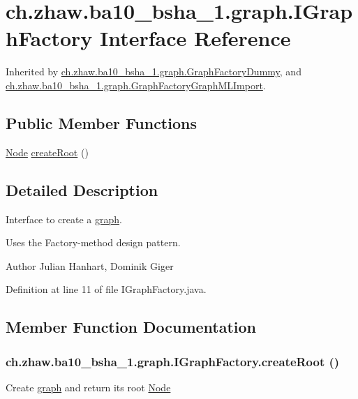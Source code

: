 \hypertarget{interfacech_1_1zhaw_1_1ba10__bsha__1_1_1graph_1_1IGraphFactory}{
\section{ch.zhaw.ba10\_\-bsha\_\-1.graph.IGraphFactory Interface Reference}
\label{interfacech_1_1zhaw_1_1ba10__bsha__1_1_1graph_1_1IGraphFactory}
}


Inherited by \hyperlink{classch_1_1zhaw_1_1ba10__bsha__1_1_1graph_1_1GraphFactoryDummy}{ch.zhaw.ba10\_\-bsha\_\-1.graph.GraphFactoryDummy}, and \hyperlink{classch_1_1zhaw_1_1ba10__bsha__1_1_1graph_1_1GraphFactoryGraphMLImport}{ch.zhaw.ba10\_\-bsha\_\-1.graph.GraphFactoryGraphMLImport}.\subsection*{Public Member Functions}
\begin{DoxyCompactItemize}
\item 
\hyperlink{classch_1_1zhaw_1_1ba10__bsha__1_1_1graph_1_1Node}{Node} \hyperlink{interfacech_1_1zhaw_1_1ba10__bsha__1_1_1graph_1_1IGraphFactory_a714465d240775f8a383c0a65356c4add}{createRoot} ()
\end{DoxyCompactItemize}


\subsection{Detailed Description}
Interface to create a \hyperlink{namespacech_1_1zhaw_1_1ba10__bsha__1_1_1graph}{graph}.

Uses the Factory-\/method design pattern.

\begin{DoxyAuthor}{Author}
Julian Hanhart, Dominik Giger 
\end{DoxyAuthor}


Definition at line 11 of file IGraphFactory.java.

\subsection{Member Function Documentation}
\hypertarget{interfacech_1_1zhaw_1_1ba10__bsha__1_1_1graph_1_1IGraphFactory_a714465d240775f8a383c0a65356c4add}{
\subsubsection[{createRoot}]{ ch.zhaw.ba10\_\-bsha\_\-1.graph.IGraphFactory.createRoot ()}}
\label{interfacech_1_1zhaw_1_1ba10__bsha__1_1_1graph_1_1IGraphFactory_a714465d240775f8a383c0a65356c4add}
Create \hyperlink{namespacech_1_1zhaw_1_1ba10__bsha__1_1_1graph}{graph} and return its root \hyperlink{classch_1_1zhaw_1_1ba10__bsha__1_1_1graph_1_1Node}{Node}

